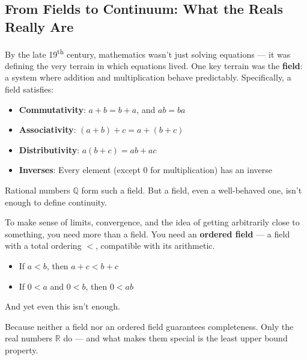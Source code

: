 \subsection{From Fields to Continuum: What the Reals Really Are}

By the late 19\textsuperscript{th} century, mathematics wasn’t just solving equations — it was defining the very terrain in which equations lived. One key terrain was the \textbf{field}: a system where addition and multiplication behave predictably. Specifically, a field satisfies:

\begin{itemize}
    \item \textbf{Commutativity}: \( a + b = b + a \), and \( ab = ba \)
    \item \textbf{Associativity}: \( (a + b) + c = a + (b + c) \)
    \item \textbf{Distributivity}: \( a(b + c) = ab + ac \)
    \item \textbf{Inverses}: Every element (except 0 for multiplication) has an inverse
\end{itemize}

Rational numbers \( \mathbb{Q} \) form such a field. But a field, even a well-behaved one, isn’t enough to define continuity.

To make sense of limits, convergence, and the idea of getting arbitrarily close to something, you need more than a field. You need an \textbf{ordered field} — a field with a total ordering \( < \), compatible with its arithmetic.

\begin{itemize}
  \item If \( a < b \), then \( a + c < b + c \)
  \item If \( 0 < a \) and \( 0 < b \), then \( 0 < ab \)
\end{itemize}

And yet even this isn’t enough.

Because neither a field nor an ordered field guarantees completeness. Only the real numbers \( \mathbb{R} \) do — and what makes them special is the least upper bound property.
